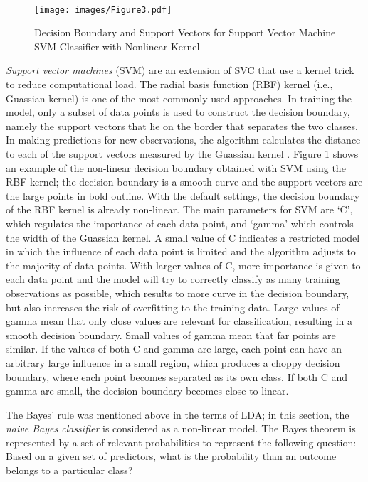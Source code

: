 \\\documentclass[sigconf]{acmart}
\begin{document}
\begin{figure}[!ht]
  \centering\texttt{[image: images/Figure3.pdf]}
  \caption{Decision Boundary and Support Vectors for Support Vector Machine 
  SVM Classifier with Nonlinear Kernel \cite{muller17}}
  \label{f:Figure3}
\end{figure}

\emph{Support vector machines} (SVM) are an extension of SVC that use a 
kernel trick to reduce computational load. The radial basis function (RBF) 
kernel (i.e., Guassian kernel) is one of the most commonly used approaches. 
In training the model, only a subset of data points is used to construct the 
decision boundary, namely the support vectors that lie on the border that 
separates the two classes. In making predictions for new observations, the 
algorithm calculates the distance to each of the support vectors measured by 
the Guassian kernel \cite{muller17}. Figure 1 shows an example of the non-linear 
decision boundary obtained with SVM using the RBF kernel; the decision boundary 
is a smooth curve and the support vectors are the large points in bold outline. 
With the default settings, the decision boundary of the RBF kernel is already 
non-linear. The main parameters for SVM are `C', which regulates the importance 
of each data point, and `gamma' which controls the width of the Guassian kernel. 
A small value of C indicates a restricted model in which the influence of each 
data point is limited and the algorithm adjusts to the majority of data points. 
With larger values of C, more importance is given to each data point and the 
model will try to correctly classify as many training observations as possible, 
which results to more curve in the decision boundary, but also increases the 
risk of overfitting to the training data. Large values of gamma mean that only 
close values are relevant for classification, resulting in a smooth decision 
boundary. Small values of gamma mean that far points are similar. If the values
of both C and gamma are large, each point can have an arbitrary large influence 
in a small region, which produces a choppy decision boundary, where each point 
becomes separated as its own class. If both C and gamma are small, the decision 
boundary becomes close to linear.


The Bayes' rule was mentioned above in the terms of LDA; in this section, 
the \emph{naive Bayes classifier} is considered as a non-linear model.
The Bayes theorem is represented by a set of relevant probabilities to 
represent the following question: Based on a given set of predictors, what
is the probability than an outcome belongs to a particular class?
\end{document}
